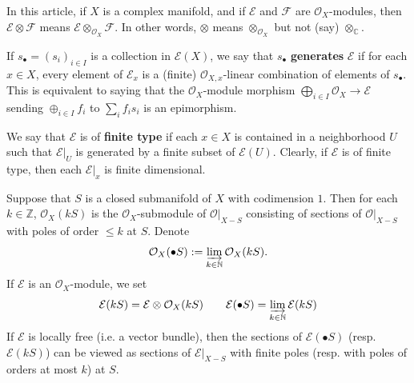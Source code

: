 \documentclass[11pt,b5paper,notitlepage]{article}
\theoremstyle{definition}
\theoremstyle{plain}
\newcommand{\mc}{\mathcal}
\newcommand{\scr}{\mathscr}
\newcommand{\blt}{\bullet}
\newcommand{\Cbb}{\mathbb C}
\newcommand{\Nbb}{\mathbb N}
\newcommand{\Zbb}{\mathbb Z}
\newcommand{\<}{\left\langle}
\renewcommand{\>}{\right\rangle}
\newcommand{\MO}{\mathcal{O}}
\newcommand{\ME}{\mathcal{E}}
\numberwithin{equation}{section}
\begin{document}
In this article, if $X$ is a complex manifold, and if $\scr E$ and $\scr F$ are $\mc O_X$-modules, then $\scr E\otimes\scr F$ means $\scr E\otimes_{\mc O_X}\scr F$. In other words, $\otimes$ means $\otimes_{\mc O_X}$ but not (say) $\otimes_\Cbb$.

If $s_\blt=(s_i)_{i\in I}$ is a collection in $\scr E(X)$, we say that $s_\blt$ \textbf{generates} $\scr E$ if for each $x\in X$, every element of $\scr E_x$ is a (finite) $\mc O_{X,x}$-linear combination of elements of $s_\blt$. This is equivalent to saying that the $\mc O_X$-module morphism $\bigoplus_{i\in I}\mc O_X\rightarrow \scr E$ sending $\oplus_{i\in I}f_i$ to $\sum_i f_is_i$ is an epimorphism.

We say that $\scr E$ is of \textbf{finite type} if each $x\in X$ is contained in a neighborhood $U$ such that $\scr E|_U$ is generated by a finite subset of $\scr E(U)$. Clearly, if $\scr E$ is of finite type, then each $\scr E|_x$ is finite dimensional.

Suppose that $S$ is a closed submanifold of $X$ with codimension $1$. Then for each $k\in \Zbb$, $\mc O_X(kS)$ is the $\mc O_X$-submodule of $\MO\vert_{X- S}$ consisting of sections of $\MO\vert_{X- S}$ with poles of order $\leq k$ at $S$. Denote 
    \begin{align*}
        \MO_X(\blt S):=\varinjlim_{k\in \Nbb}\MO_X(k S).
    \end{align*}
If $\ME$ is an $\MO_X$-module, we set \index{ES@$\mc E(kS),\mc E(\blt S)$}
    \begin{gather*}
\mc E(kS)=\mc E\otimes\mc O_X(kS)\qquad \mc E(\blt S)=\varinjlim_{k\in \Nbb}\ME(k S)
    \end{gather*}
    If $\mc E$ is locally free (i.e. a vector bundle), then the sections of $\mc E(\blt S)$ (resp. $\mc E(k S)$) can be viewed as sections of $\mc E|_{X- S}$ with finite poles (resp. with poles of orders at most $k$) at $S$.
\end{document}
